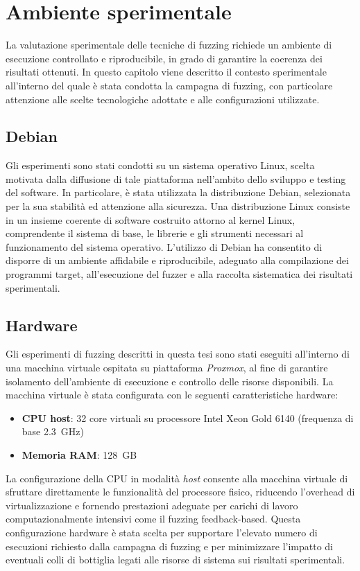 \chapter{Ambiente sperimentale}

La valutazione sperimentale delle tecniche di fuzzing richiede un ambiente di esecuzione controllato e riproducibile, in grado di garantire la coerenza dei risultati ottenuti.
In questo capitolo viene descritto il contesto sperimentale all'interno del quale è stata condotta la campagna di fuzzing, con particolare attenzione alle scelte tecnologiche adottate e alle configurazioni utilizzate.

\section{Debian}

Gli esperimenti sono stati condotti su un sistema operativo Linux, scelta motivata dalla diffusione di tale piattaforma nell'ambito dello sviluppo e testing del software.
In particolare, è stata utilizzata la distribuzione Debian, selezionata per la sua stabilità ed attenzione alla sicurezza.
Una distribuzione Linux consiste in un insieme coerente di software costruito attorno al kernel Linux, comprendente il sistema di base, le librerie e gli strumenti necessari al funzionamento del sistema operativo.
L'utilizzo di Debian ha consentito di disporre di un ambiente affidabile e riproducibile, adeguato alla compilazione dei programmi target, all'esecuzione del fuzzer e alla raccolta sistematica dei risultati sperimentali.

\section{Hardware}
Gli esperimenti di fuzzing descritti in questa tesi sono stati eseguiti all’interno di una macchina virtuale ospitata su piattaforma \textit{Proxmox}, al fine di garantire isolamento dell’ambiente di esecuzione e controllo delle risorse disponibili.
La macchina virtuale è stata configurata con le seguenti caratteristiche hardware:
\begin{itemize}
\item \textbf{CPU host}: 32 core virtuali su processore Intel Xeon Gold 6140 (frequenza di base 2.3~GHz)
\item \textbf{Memoria RAM}: 128~GB
\end{itemize}

\noindent
La configurazione della CPU in modalità \textit{host} consente alla macchina virtuale di sfruttare direttamente le funzionalità del processore fisico, riducendo l’overhead di virtualizzazione e fornendo prestazioni adeguate per carichi di lavoro computazionalmente intensivi come il fuzzing feedback-based.
Questa configurazione hardware è stata scelta per supportare l’elevato numero di esecuzioni richiesto dalla campagna di fuzzing e per minimizzare l’impatto di eventuali colli di bottiglia legati alle risorse di sistema sui risultati sperimentali.



